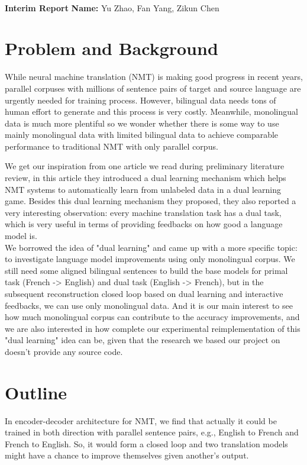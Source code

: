 \documentclass[11pt]{article}
\begin{document}
\\
{{\bf Interim Report} \hfill {{\bf Name:} Yu Zhao, Fan Yang, Zikun Chen} \\
\part{Problem and Background}
While neural machine translation (NMT) is making good progress in recent years, parallel corpuses with millions of sentence pairs of target and source language are urgently needed for training process. However, bilingual data needs tons of human effort to generate and this process is very costly. Meanwhile, monolingual data is much more plentiful so we wonder whether there is some way to use mainly monolingual data with limited bilingual data to achieve comparable performance to traditional NMT with only parallel corpus.


We get our inspiration from one article\cite{he2016dual} we read during preliminary literature review, in this article they introduced a dual learning mechanism which helps NMT systems to automatically learn from unlabeled data in a dual learning game. Besides this dual learning mechanism they proposed, they also reported a very interesting observation: every machine translation task has a dual task, which is very useful in terms of providing feedbacks on how good a language model is. 
\\
\indent We borrowed the idea of "dual learning" and came up with a more specific topic: to investigate language model improvements using only monolingual corpus. We still need some aligned bilingual sentences to build the base models for primal task (French -> English) and dual task (English -> French), but in the subsequent reconstruction closed loop based on dual learning and interactive feedbacks, we can use only monolingual data. And it is our main interest to see how much monolingual corpus can contribute to the accuracy improvements, and we are also interested in how complete our experimental reimplementation of this "dual learning" idea can be, given that the research we based our project on doesn't provide any source code.

\part{Outline}
In encoder-decoder architecture for NMT, we find that actually it could be trained in both direction with parallel sentence pairs, e.g., English to French and French to English. So, it would form a closed loop and two translation models might have a chance to improve themselves given another's output.

}
\end{document}
